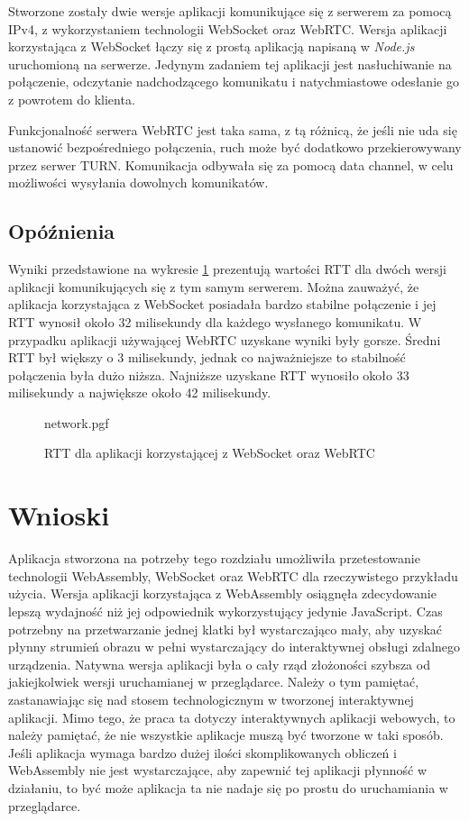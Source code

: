 \documentclass[language=polish,type=master]{aghmodern}
\begin{document}
Stworzone zostały dwie wersje aplikacji komunikujące się z serwerem za pomocą IPv4, z wykorzystaniem technologii WebSocket oraz WebRTC.
Wersja aplikacji korzystająca z WebSocket łączy się z prostą aplikacją napisaną w \emph{Node.js}\footnotemark{} uruchomioną na serwerze.
Jedynym zadaniem tej aplikacji jest nasłuchiwanie na połączenie, odczytanie nadchodzącego komunikatu i natychmiastowe odesłanie go z powrotem do klienta.

Funkcjonalność serwera WebRTC jest taka sama, z tą różnicą, że jeśli nie uda się ustanowić bezpośredniego połączenia, ruch może być dodatkowo przekierowywany przez serwer TURN.
Komunikacja odbywała się za pomocą data channel, w celu możliwości wysyłania dowolnych komunikatów.

\subsection{Opóźnienia}
Wyniki przedstawione na wykresie \ref{fig:network} prezentują wartości RTT dla dwóch wersji aplikacji komunikujących się z tym samym serwerem.
Można zauważyć, że aplikacja korzystająca z WebSocket posiadała bardzo stabilne połączenie i jej RTT wynosił około 32 milisekundy dla każdego wysłanego komunikatu.
W przypadku aplikacji używającej WebRTC uzyskane wyniki były gorsze.
Średni RTT był większy o 3 milisekundy, jednak co najważniejsze to stabilność połączenia była dużo niższa.
Najniższe uzyskane RTT wynosiło około 33 milisekundy a największe około 42 milisekundy.

\begin{figure}[H]
    \centering
    {network.pgf}
    \vspace*{5pt}
    \caption{RTT dla aplikacji korzystającej z WebSocket oraz WebRTC}
    \label{fig:network}
\end{figure}

\section{Wnioski}
Aplikacja stworzona na potrzeby tego rozdziału umożliwiła przetestowanie technologii WebAssembly, WebSocket oraz WebRTC dla rzeczywistego przykładu użycia.
Wersja aplikacji korzystająca z WebAssembly osiągnęła zdecydowanie lepszą wydajność niż jej odpowiednik wykorzystujący jedynie JavaScript.
Czas potrzebny na przetwarzanie jednej klatki był wystarczająco mały, aby uzyskać płynny strumień obrazu w pełni wystarczający do interaktywnej obsługi zdalnego urządzenia.
Natywna wersja aplikacji była o cały rząd złożoności szybsza od jakiejkolwiek wersji uruchamianej w przeglądarce.
Należy o tym pamiętać, zastanawiając się nad stosem technologicznym w tworzonej interaktywnej aplikacji.
Mimo tego, że praca ta dotyczy interaktywnych aplikacji webowych, to należy pamiętać, że nie wszystkie aplikacje muszą być tworzone w taki sposób.
Jeśli aplikacja wymaga bardzo dużej ilości skomplikowanych obliczeń i WebAssembly nie jest wystarczające, aby zapewnić tej aplikacji płynność w działaniu, to być może aplikacja ta nie nadaje się po prostu do uruchamiania w przeglądarce.
\end{document}
